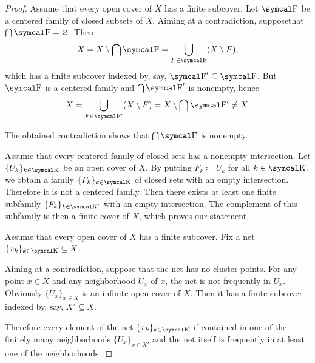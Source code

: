 \begin{proof}
   Assume that every open cover of \( X \) has a finite subcover. Let \( \CF \) be a centered family of closed subsets of \( X \). Aiming at a contradiction, suppose\LEM that \( \bigcap \CF = \varnothing \). Then
  \begin{equation*}
    X
    =
    X \setminus \bigcap \CF
    =
    \bigcup_{F \in \CF} (X \setminus F),
  \end{equation*}
  which has a finite subcover indexed by, say, \( \CF' \subseteq \CF \). But \( \CF \) is a centered family and \( \bigcap \CF' \) is nonempty, hence
  \begin{equation*}
    X
    =
    \bigcup_{F \in \CF'} (X \setminus F)
    =
    X \setminus \bigcap \CF'
    \neq
    X.
  \end{equation*}

  The obtained contradiction shows that \( \bigcap \CF \) is nonempty.

   Assume that every centered family of closed sets has a nonempty intersection. Let \( \{ U_k \}_{k \in \CK} \) be an open cover of \( X \). By putting \( F_k \coloneqq U_k \) for all \( k \in \CK \), we obtain a family \( \{ F_k \}_{k \in \CK} \) of closed sets with an empty intersection. Therefore it is not a centered family. Then there exists at least one finite subfamily \( \{ F_k \}_{k \in \CK'} \) with an empty intersection. The complement of this subfamily is then a finite cover of \( X \), which proves our statement.

   Assume that every open cover of \( X \) has a finite subcover. Fix a net \( \{ x_k \}_{k \in \CK} \subseteq X \).

  Aiming at a contradiction, suppose that the net has no cluster points. For any point \( x \in X \) and any neighborhood \( U_x \) of \( x \), the net is not frequently in \( U_x \). Obviously \( \{ U_x \}_{x \in X} \) is an infinite open cover of \( X \). Then it has a finite subcover indexed by, say, \( X' \subseteq X \).

  Therefore every element of the net \( \{ x_k \}_{k \in \CK} \) if contained in one of the finitely many neighborhoods \( \{ U_x \}_{x \in X'} \) and the net itself is frequently in at least one of the neighborhoods.


\end{proof}
